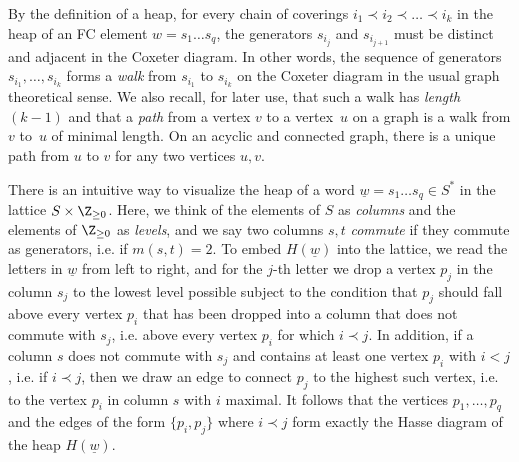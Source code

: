 \begin{remark}
    \label{rmk:chainsAndWalks}
    By the definition of a heap, for every chain of coverings $i_1\prec i_2 \prec \dots \prec i_k$ in the
    heap of an FC element $w=s_1\dots s_q$, the generators $s_{i_j}$ and $s_{i_{j+1}}$  must be
    distinct and adjacent in the Coxeter diagram. In other words, the sequence of generators
    $s_{i_1},\dots, s_{i_k}$ forms a \emph{walk} from $s_{i_1}$ to $s_{i_k}$ on the Coxeter diagram
    in the usual graph theoretical sense. We also recall, for later use, that such a walk has
    \emph{length} $(k-1)$ and that a \emph{path} from a vertex $v$ to a vertex~$u$ on a graph is a
    walk from $v$ to~$u$ of minimal length. On an acyclic and connected graph, there is a unique
    path from $u$ to $v$ for any two vertices $u,v$.  
\end{remark}

There is an intuitive way to visualize the heap of a word $\underline w=s_1\dots s_q\in S^*$ in the
lattice $S\times \Z_{\ge 0}$. Here, we think of the elements of $S$ as \emph{columns} and the
elements of $\Z_{\ge 0}$ as \emph{levels}, and we say two columns $s,t$ \emph{commute} if they
commute as generators, i.e. if $m(s,t)= 2$. To embed $H(\underline w)$ into the lattice, we read
the letters in $\underline w$ from left to right, and for the $j$-th letter we drop a vertex $p_j$
in the column $s_j$ to the lowest level possible subject to the condition that $p_j$ should fall
above every vertex $p_i$ that has been dropped into a column that does not commute with $s_j$, i.e.
above every vertex $p_i$ for which $i\prec j$. In addition, if a column $s$ does not commute with
$s_j$ and contains at least one vertex $p_i$ with $i<j$, i.e. if $i\prec j$, then we draw an edge
to connect $p_j$ to the highest such vertex, i.e. to the vertex $p_i$ in column $s$ with $i$
maximal. It follows that the vertices $p_1,\dots, p_q$ and the edges of the form $\{p_i,p_j\}$ where
$i\prec j$ form exactly the Hasse diagram of the heap $H(\underline w)$. 

